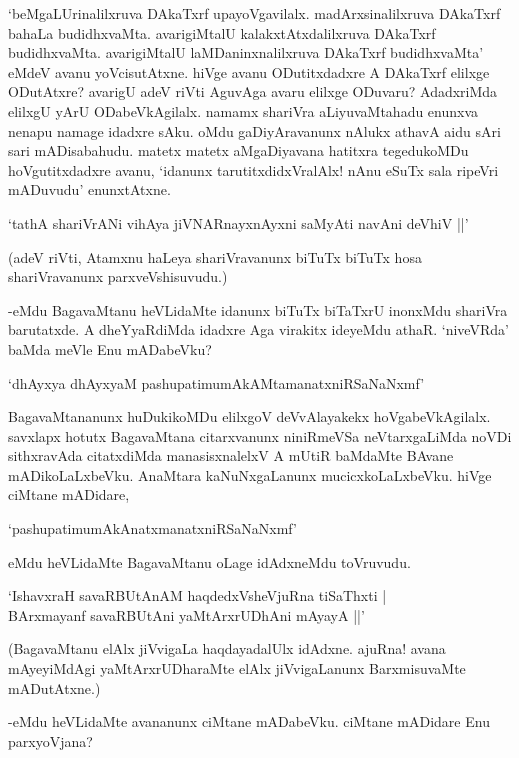 `beMgaLUrinalilxruva DAkaTxrf upayoVgavilalx. madArxsinalilxruva DAkaTxrf bahaLa budidhxvaMta. avarigiMtalU kalakxtAtxdalilxruva DAkaTxrf budidhxvaMta. avarigiMtalU laMDaninxnalilxruva DAkaTxrf budidhxvaMta' eMdeV avanu yoVcisutAtxne. hiVge avanu ODutitxdadxre A DAkaTxrf elilxge ODutAtxre? avarigU adeV riVti AguvAga avaru elilxge ODuvaru? AdadxriMda elilxgU yArU ODabeVkAgilalx. namamx shariVra aLiyuvaMtahadu enunxva nenapu namage idadxre sAku. oMdu gaDiyAravanunx nAlukx athavA aidu sAri sari mADisabahudu. matetx matetx aMgaDiyavana hatitxra tegedukoMDu hoVgutitxdadxre avanu, `idanunx tarutitxdidxVralAlx! nAnu eSuTx sala ripeVri mADuvudu' enunxtAtxne.

\begin{shloka}
`tathA shariVrANi vihAya jiVNARnayxnAyxni saMyAti navAni deVhiV ||'
\end{shloka}

(adeV riVti, Atamxnu haLeya shariVravanunx biTuTx biTuTx hosa shariVravanunx parxveVshisuvudu.)


-eMdu BagavaMtanu heVLidaMte idanunx biTuTx biTaTxrU inonxMdu shariVra barutatxde. A dheYyaRdiMda idadxre Aga virakitx ideyeMdu athaR. `niveVRda' baMda meVle Enu mADabeVku?

\begin{shloka}
`dhAyxya dhAyxyaM pashupatimumAkAMtamanatxniRSaNaNxmf'
\end{shloka}

BagavaMtananunx huDukikoMDu elilxgoV deVvAlayakekx hoVgabeVkAgilalx. savxlapx hotutx BagavaMtana citarxvanunx niniRmeVSa neVtarxgaLiMda noVDi sithxravAda citatxdiMda manasisxnalelxV A mUtiR baMdaMte BAvane mADikoLaLxbeVku. AnaMtara kaNuNxgaLanunx mucicxkoLaLxbeVku. hiVge ciMtane mADidare,

\begin{shloka}
`pashupatimumAkAnatxmanatxniRSaNaNxmf'
\end{shloka}

eMdu heVLidaMte BagavaMtanu oLage idAdxneMdu toVruvudu.

\begin{shloka}
`IshavxraH savaRBUtAnAM haqdedxVsheVjuRna tiSaThxti |\\
BArxmayanf savaRBUtAni yaMtArxrUDhAni mAyayA ||'
\end{shloka}

(BagavaMtanu elAlx jiVvigaLa haqdayadalUlx idAdxne. ajuRna! avana mAyeyiMdAgi yaMtArxrUDharaMte elAlx jiVvigaLanunx BarxmisuvaMte mADutAtxne.)

-eMdu heVLidaMte avananunx ciMtane mADabeVku. ciMtane mADidare Enu parxyoVjana?

